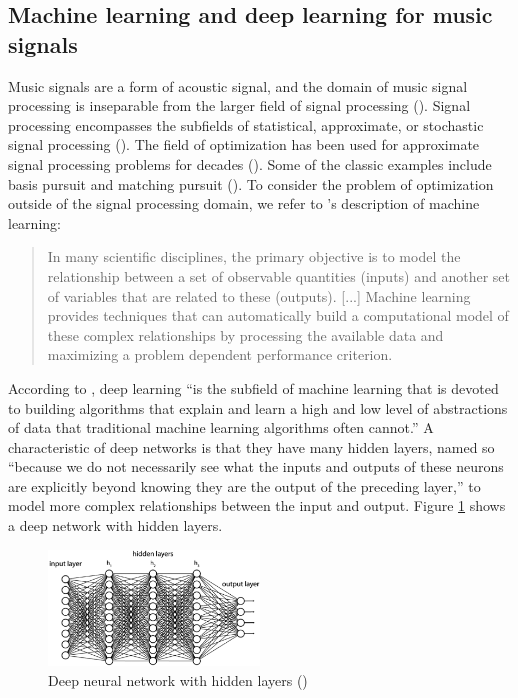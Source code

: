 \documentclass[report.tex]{subfiles}
\begin{document}
\newpagefill

\subsection{Machine learning and deep learning for music signals}
\label{sec:ml}

Music signals are a form of acoustic signal, and the domain of music signal processing is inseparable from the larger field of signal processing (\cite{musicsp}). Signal processing encompasses the subfields of statistical, approximate, or stochastic signal processing (\cite{stochasticsp, statisticalsp}). The field of optimization has been used for approximate signal processing problems for decades (\cite{optsp}). Some of the classic examples include basis pursuit and matching pursuit (\cite{dictionary1, dictionary2}). To consider the problem of optimization outside of the signal processing domain, we refer to \textcite{introtoml}'s description of machine learning:

\begin{quote}
	In many scientific disciplines, the primary objective is to model the relationship between a set of observable quantities (inputs) and another set of variables that are related to these (outputs). [...] Machine learning provides techniques that can automatically build a computational model of these complex relationships by processing the available data and maximizing a problem dependent performance criterion.
\end{quote}

According to \textcite{introtodl}, deep learning ``is the subfield of machine learning that is devoted to building algorithms that explain and learn a high and low level of abstractions of data that traditional machine learning algorithms often cannot.'' A characteristic of deep networks is that they have many hidden layers, named so ``because we do not necessarily see what the inputs and outputs of these neurons are explicitly beyond knowing they are the output of the preceding layer,'' to model more complex relationships between the input and output. Figure \ref{fig:fcdn} shows a deep network with hidden layers.

\begin{figure}[ht]
	\centering
	\includegraphics[width=0.5\textwidth]{./images-neural/dnn.png}
	\caption{Deep neural network with hidden layers (\cite{introtodl})}
	\label{fig:fcdn}
\end{figure}
\end{document}
